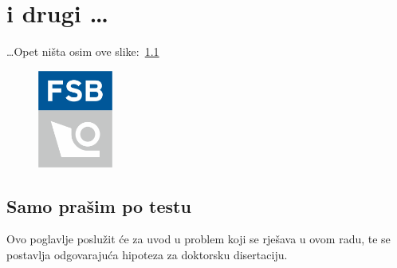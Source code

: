 \documentclass[a4paper,12pt]{report}
\begin{document}
\chapter{i drugi \dots}
\dots Opet ništa osim ove slike:~\ref{dodatna}
\begin{figure}
  \centering
  \includegraphics[height=3.2cm]{fsb_logo_v}
  \label{dodatna}
\end{figure}
\newpage
\section{Samo prašim po testu}
Ovo poglavlje poslu\v{z}it \'{c}e za uvod u problem koji se rje\v{s}ava u ovom
radu, te se postavlja odgovaraju\'{c}a hipoteza za doktorsku
disertaciju.


%

\newpage
\ifpdf
\fi

\end{document}
